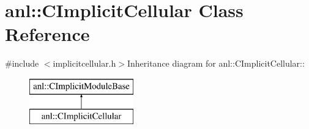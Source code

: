 \hypertarget{classanl_1_1CImplicitCellular}{
\section{anl::CImplicitCellular Class Reference}
\label{classanl_1_1CImplicitCellular}
}


{\ttfamily \#include $<$implicitcellular.h$>$}Inheritance diagram for anl::CImplicitCellular::\begin{figure}[H]
\begin{center}
\leavevmode
\includegraphics[height=2cm]{classanl_1_1CImplicitCellular}
\end{center}
\end{figure}

